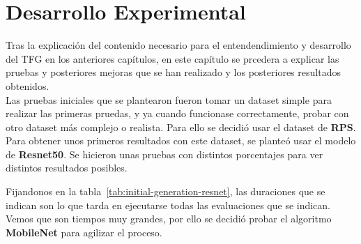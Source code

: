 \chapter{Desarrollo Experimental}\label{ch:desarrollo-experimental}

Tras la explicación del contenido necesario para el entendendimiento y desarrollo del TFG en los anteriores capítulos,
en este capítulo se prcedera a explicar las pruebas y posteriores mejoras que se han realizado y los posteriores
resultados obtenidos. \\[6pt]

Las pruebas iniciales que se plantearon fueron tomar un dataset simple para realizar las primeras pruedas, y ya cuando
funcionase correctamente, probar con otro dataset más complejo o realista.
Para ello se decidió usar el dataset de \textbf{RPS}. \\[6pt]

Para obtener unos primeros resultados con este dataset, se planteó usar el modelo de \textbf{Resnet50}.
Se hicieron unas pruebas con distintos porcentajes para ver distintos resultados posibles.

\begin{table}[htp]
    \centering
    \caption{Resultados de la generación inicial con \textbf{Resnet50}}
    \label{tab:initial-generation-resnet}
\end{table}

Fijandonos en la tabla~\ref{tab:initial-generation-resnet}, las duraciones que se indican son lo que tarda en
ejecutarse todas las evaluaciones que se indican.
Vemos que son tiempos muy grandes, por ello se decidió probar el algoritmo \textbf{MobileNet} para agilizar el proceso.

